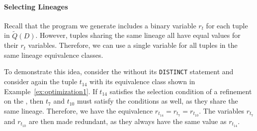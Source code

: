 

\paragraph*{Selecting Lineages} 
Recall that the program we generate includes a binary variable $r_t$ for each tuple in $\widetilde{Q}(D)$. However, tuples sharing the same lineage all have equal values for their $r_t$ variables. Therefore, we can use a single variable for all tuples in the same lineage equivalence classes. 

\begin{example}
    To demonstrate this idea, consider the \running{} without its {\tt DISTINCT} statement and consider again the tuple $t_{14}$ with its equivalence class shown in Example~\ref{ex:optimization1}. If $t_{14}$ satisfies the selection condition of a refinement on the \running{}, then $t_7$ and $t_{10}$ must satisfy the conditions as well, as they share the same lineage. Therefore, we have the equivalence $r_{t_{14}} = r_{t_7} = r_{t_{10}}$. The variables $r_{t_7}$ and $r_{t_{10}}$ are then made redundant, as they always have the same value as $r_{t_{14}}$. 
\end{example}

